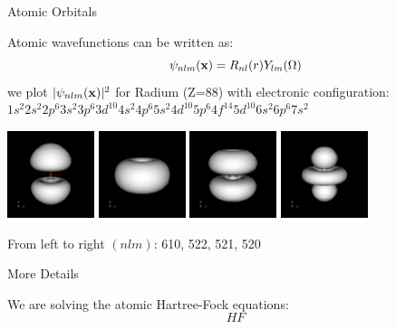 \documentclass{beamer}
\begin{document}
\begin{frame}{Atomic Orbitals}

Atomic wavefunctions can be written as:
\[
    \psi_{nlm}({\bf x}) = R_{nl}(r) Y_{lm}(\Omega)
\]
we plot $| \psi_{nlm}({\bf x})|^2$ for Radium (Z=88) with electronic
configuration: $1s^2 2s^2 2p^6 3s^2 3p^6 3d^{10} 4s^2 4p^6 5s^2 4d^{10}
5p^6 4f^{14} 5d^{10} 6s^2 6p^6 7s^2$

\includegraphics[width=1in]{../img/orbital_n6l1m0.png}
\includegraphics[width=1in]{../img/orbital_n5l2m2.png}
\includegraphics[width=1in]{../img/orbital_n5l2m1.png}
\includegraphics[width=1in]{../img/orbital_n5l2m0.png}

From left to right $(n l m)$: 610, 522, 521, 520

\end{frame}

\begin{frame}{More Details}

We are solving the atomic Hartree-Fock equations:
\[
    HF
\]

\end{frame}
\end{document}
